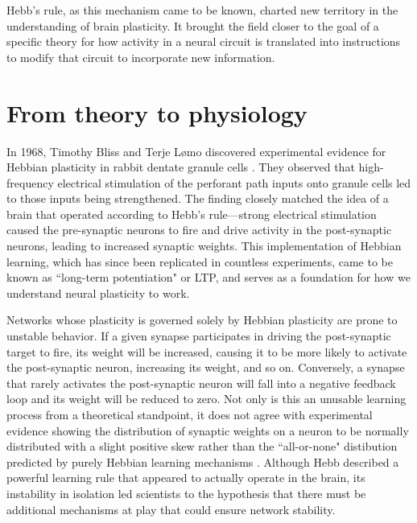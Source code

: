Hebb's rule, as this mechanism came to be known, charted new territory in the understanding of brain plasticity. It brought the field closer to the goal of a specific theory for how activity in a neural circuit is translated into instructions to modify that circuit to incorporate new information.

\section{From theory to physiology}

In 1968, Timothy Bliss and Terje L\o mo discovered experimental evidence for Hebbian plasticity in rabbit dentate granule cells \cite{Bliss1973}. They observed that high-frequency electrical stimulation of the perforant path inputs onto granule cells led to those inputs being strengthened. The finding closely matched the idea of a brain that operated according to Hebb's rule---strong electrical stimulation caused the pre-synaptic neurons to fire and drive activity in the post-synaptic neurons, leading to increased synaptic weights. This implementation of Hebbian learning, which has since been replicated in countless experiments, came to be known as ``long-term potentiation" or LTP, and serves as a foundation for how we understand neural plasticity to work.

Networks whose plasticity is governed solely by Hebbian plasticity are prone to unstable behavior. If a given synapse participates in driving the post-synaptic target to fire, its weight will be increased, causing it to be more likely to activate the post-synaptic neuron, increasing its weight, and so on. Conversely, a synapse that rarely activates the post-synaptic neuron will fall into a negative feedback loop and its weight will be reduced to zero. Not only is this an unusable learning process from a theoretical standpoint, it does not agree with experimental evidence showing the distribution of synaptic weights on a neuron to be normally distributed with a slight positive skew rather than the ``all-or-none" distibution predicted by purely Hebbian learning mechanisms \cite{Turrigiano1998}. Although Hebb described a powerful learning rule that appeared to actually operate in the brain, its instability in isolation led scientists to the hypothesis that there must be additional mechanisms at play that could ensure network stability.

